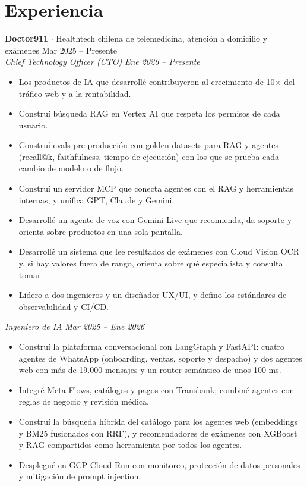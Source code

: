 \documentclass[a4paper,10pt]{article}
\begin{document}
\section*{Experiencia}
\textbf{Doctor911} $\cdot$ Healthtech chilena de telemedicina, atención a domicilio y exámenes \hfill Mar 2025 -- Presente\\
\textit{Chief Technology Officer (CTO)} \hfill \textit{Ene 2026 -- Presente}
\begin{itemize}
\item Los productos de IA que desarrollé contribuyeron al crecimiento de 10$\times$ del tráfico web y a la rentabilidad.
\item Construí búsqueda RAG en Vertex AI que respeta los permisos de cada usuario.
\item Construí evals pre-producción con golden datasets para RAG y agentes (recall@k, faithfulness, tiempo de ejecución) con los que se prueba cada cambio de modelo o de flujo.
\item Construí un servidor MCP que conecta agentes con el RAG y herramientas internas, y unifica GPT, Claude y Gemini.
\item Desarrollé un agente de voz con Gemini Live que recomienda, da soporte y orienta sobre productos en una sola pantalla.
\item Desarrollé un sistema que lee resultados de exámenes con Cloud Vision OCR y, si hay valores fuera de rango, orienta sobre qué especialista y consulta tomar.
\item Lidero a dos ingenieros y un diseñador UX/UI, y defino los estándares de observabilidad y CI/CD.
\end{itemize}
\textit{Ingeniero de IA} \hfill \textit{Mar 2025 -- Ene 2026}
\begin{itemize}
\item Construí la plataforma conversacional con LangGraph y FastAPI: cuatro agentes de WhatsApp (onboarding, ventas, soporte y despacho) y dos agentes web con más de 19.000 mensajes y un router semántico de unos 100 ms.
\item Integré Meta Flows, catálogos y pagos con Transbank; combiné agentes con reglas de negocio y revisión médica.
\item Construí la búsqueda híbrida del catálogo para los agentes web (embeddings y BM25 fusionados con RRF), y recomendadores de exámenes con XGBoost y RAG compartidos como herramienta por todos los agentes.
\item Desplegué en GCP Cloud Run con monitoreo, protección de datos personales y mitigación de prompt injection.
\end{itemize}
\end{document}
